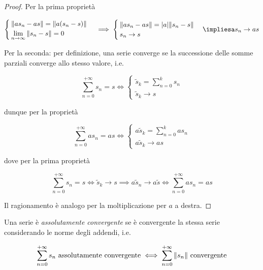 \begin{proof}
	Per la prima proprietà
	
	\begin{equation}
		\begin{cases}
			\norm{a s_{n} - a s} = \norm{a (s_{n} - s)}\\
			\lim\limits_{n \to \infty} \norm{s_{n} - s} = 0
		\end{cases}
		\implies%
		\begin{cases}
			\norm{a s_{n} - a s} = \abs{a} \norm{s_{n} - s}\\
			s_{n} \to s
		\end{cases}
		\implies%
		a s_{n} \to a s
	\end{equation}

	Per la seconda: per definizione, una serie converge se la successione delle somme parziali converge allo stesso valore, i.e.
	
	\begin{equation}
		\sum_{n=0}^{+\infty} s_{n} = s %
		\iff%
		\begin{cases}
			\displaystyle \tilde{s}_{k} = \sum_{n=0}^{k} s_{n}\\
			\tilde{s}_{k} \to s
		\end{cases}
	\end{equation}

	dunque per la proprietà
	
	\begin{equation}
		\sum_{n=0}^{+\infty} a s_{n} = a s %
		\iff%
		\begin{cases}
			\displaystyle a \tilde{s}_{k} = \sum_{n=0}^{k} a s_{n}\\
			a \tilde{s}_{k} \to a s
		\end{cases}
	\end{equation}

	dove per la prima proprietà
	
	\begin{equation}
		\sum_{n=0}^{+\infty} s_{n} = s %
		\iff%
		\tilde{s}_{k} \to s%
		\implies%
		a \tilde{s}_{n} \to a \tilde{s} %
		\iff%
		\sum_{n=0}^{+\infty} a s_{n} = a s
	\end{equation}

	Il ragionamento è analogo per la moltiplicazione per $ a $ a destra.
\end{proof}

Una serie è \textit{assolutamente convergente} se è convergente la stessa serie considerando le norme degli addendi, i.e.

\begin{equation}
	\sum_{n=0}^{+\infty} s_{n} \text{ assolutamente convergente} \iff \sum_{n=0}^{+\infty} \norm{s_{n}} \text{ convergente}
\end{equation}

